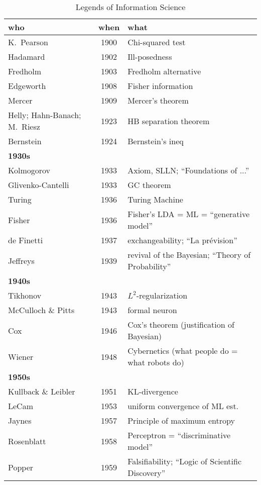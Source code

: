 \documentclass[a4paper]{article}
\begin{document}
\begin{table}[h]
  \centering
  \caption{Legends of Information Science}
  \begin{tabular}{@{\hspace{2em}}lcp{7cm}}
    \toprule
    who & when & what \\
    \midrule
    K.~Pearson & 1900 & Chi-squared test \\
    Hadamard & 1902 & Ill-posedness \\
    Fredholm & 1903 & Fredholm alternative \\
    Edgeworth & 1908 & Fisher information \\
    Mercer & 1909 & Mercer's theorem \\
    Helly; Hahn-Banach; M.~Riesz & 1923 & HB separation theorem \\
    Bernstein & 1924 & Bernstein's ineq \\

    \multicolumn{3}{l}{\textbf{1930s}} \\
    Kolmogorov & 1933 & Axiom, SLLN; ``Foundations of ...'' \\
    Glivenko-Cantelli & 1933 & GC theorem \\
    Turing & 1936 & Turing Machine \\
    Fisher & 1936 & Fisher's LDA = ML = ``generative model'' \\
    de Finetti & 1937 & exchangeability; ``La pr\'{e}vision'' \\
    Jeffreys & 1939 & revival of the Bayesian; ``Theory of Probability''\\

    \multicolumn{3}{l}{\textbf{1940s}} \\
    Tikhonov & 1943 & $L^2$-regularization \\
    McCulloch \& Pitts & 1943 & formal neuron \\
    Cox & 1946 & Cox's theorem (justification of Bayesian) \\
    Wiener & 1948 & Cybernetics (what people do = what robots do) \\

    \multicolumn{3}{l}{\textbf{1950s}} \\
    Kullback \& Leibler & 1951 & KL-divergence \\
    LeCam & 1953 & uniform convergence of ML est. \\
    Jaynes & 1957 & Principle of maximum entropy \\
    Rosenblatt & 1958 & Perceptron = ``discriminative model'' \\
    Popper & 1959 & Falsifiability; ``Logic of Scientific Discovery'' \\
    \bottomrule
  \end{tabular}
\end{table}
\end{document}
